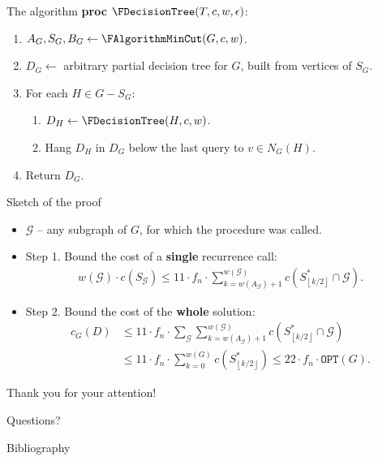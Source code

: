 \documentclass{beamer}
\newcommand{\br}[1]{\mathopen{}\left( #1 \right)}
\newcommand{\fl}[1]{\mathopen{}\left\lfloor #1 \right\rfloor}
\newcommand{\OPT}{\texttt{OPT}}
\begin{document}
\begin{frame}{The algorithm}
\textbf{proc} $\FDecisionTree\br{T,c,w,\epsilon}$:
\begin{enumerate}
    \item $A_G,S_G, B_G\gets\FAlgorithmMinCut\br{G, c, w}$.
    \item $D_G\gets$ arbitrary partial decision tree for $G$, built from vertices of $S_G$.
    \item For each $H\in G-S_G$:
    \begin{enumerate}
        \item $D_H\gets \FDecisionTree\br{H, c, w}$.
        \item Hang $D_H$ in $D_G$ below the last query to $v\in N_G\br{H}$.
    \end{enumerate}
    \item Return $D_G$.
\end{enumerate}
\end{frame}

\begin{frame}{Sketch of the proof}

    \begin{itemize}
        \item $\mathcal{G}$ – any subgraph of $G$, for which the procedure was called.
    \item Step 1. Bound the cost of a \textbf{single} recurrence call:
    \begin{align*}
        w\br{\mathcal{G}}\cdot c\br{S_{\mathcal{G}}}\leq 
        11 \cdot f_n\cdot \sum_{k=w\br{A_{\mathcal{G}}}+1}^{w\br{\mathcal{G}}}c\br{S_{\fl{k/2}}^*\cap \mathcal{G}}.
        \end{align*}
    \pause
    \item Step 2. Bound the cost of the \textbf{whole} solution:
    \begin{align*}
            c_G\br{D}&\leq 11 \cdot f_n\cdot \sum_{\mathcal{G}}\sum_{k=w\br{A_{\mathcal{G}}}+1}^{w\br{\mathcal{G}}}c\br{S_{\fl{k/2}}^*\cap \mathcal{G}}
            \\&\leq 
            11 \cdot f_n\cdot\sum_{k=0}^{w\br{G}}c\br{S_{\fl{k/2}}^*} \leq  22 \cdot f_n \cdot \OPT\br{G}.
        \end{align*}
\end{itemize} 
\end{frame}


\begin{frame}
\centering
\huge
Thank you for your attention!

Questions?
\end{frame}

\begin{frame}[allowframebreaks]{Bibliography}
\printbibliography
\end{frame}
\end{document}
